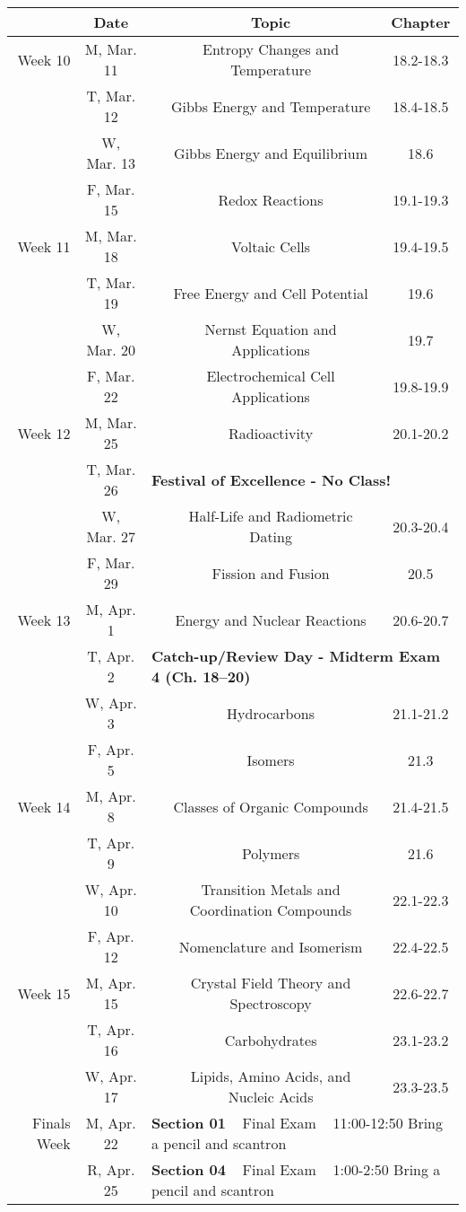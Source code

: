 \documentclass[12pt, letterpaper]{article}
\begin{document}
\begin{tabular}{rcccc}
& Date && Topic & Chapter\\
\midrule
Week 10 & M, Mar. 11&& Entropy Changes and Temperature & 18.2-18.3\\
& T, Mar. 12&& Gibbs Energy and Temperature & 18.4-18.5\\
& W, Mar. 13&& Gibbs Energy and Equilibrium & 18.6\\
& F, Mar. 15&& Redox Reactions & 19.1-19.3\\
\midrule
Week 11 & M, Mar. 18&& Voltaic Cells & 19.4-19.5\\
& T, Mar. 19&& Free Energy and Cell Potential & 19.6\\
& W, Mar. 20&& Nernst Equation and Applications & 19.7\\
& F, Mar. 22&& Electrochemical Cell Applications & 19.8-19.9\\
\midrule
Week 12 & M, Mar. 25&& Radioactivity & 20.1-20.2\\
& T, Mar. 26& \multicolumn{3}{l}{\textbf{Festival of Excellence - No Class!}}\\
& W, Mar. 27&& Half-Life and Radiometric Dating & 20.3-20.4\\
& F, Mar. 29&& Fission and Fusion & 20.5\\
\midrule
Week 13 & M, Apr. 1&& Energy and Nuclear Reactions & 20.6-20.7\\
& T, Apr. 2& \multicolumn{3}{l}{\textbf{Catch-up/Review Day - Midterm Exam 4 (Ch. 18--20)}}\\
& W, Apr. 3&& Hydrocarbons & 21.1-21.2\\
& F, Apr. 5&& Isomers & 21.3\\
\midrule
Week 14 & M, Apr. 8&& Classes of Organic Compounds & 21.4-21.5\\
& T, Apr. 9&& Polymers & 21.6\\
& W, Apr. 10&& Transition Metals and Coordination Compounds & 22.1-22.3\\
& F, Apr. 12&& Nomenclature and Isomerism & 22.4-22.5\\
\midrule
Week 15 & M, Apr. 15&& Crystal Field Theory and Spectroscopy & 22.6-22.7\\
& T, Apr. 16&& Carbohydrates & 23.1-23.2\\
& W, Apr. 17&& Lipids, Amino Acids, and Nucleic Acids & 23.3-23.5\\
\midrule
\midrule
Finals Week& M, Apr. 22& \multicolumn{3}{l}{\textbf{Section 01} ~ Final Exam ~ 11:00-12:50 Bring a pencil and scantron}\\
           & R, Apr. 25& \multicolumn{3}{l}{\textbf{Section 04} ~ Final Exam ~ 1:00-2:50 Bring a pencil and scantron}\\
\end{tabular}
\end{document}
